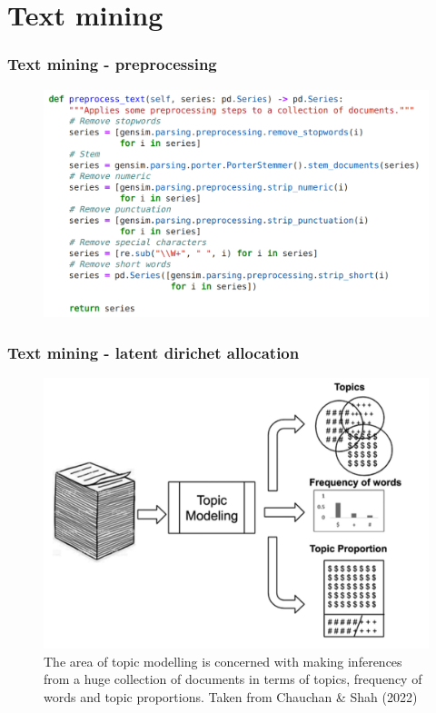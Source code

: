 \documentclass{beamer}
\begin{document}
\section{Text mining}
\begin{frame}
\frametitle{Text mining - preprocessing}

\begin{figure}
\includegraphics[width=0.6\linewidth]{../visualizations/preprocess_text_code.png}
\end{figure}

\end{frame}


\begin{frame}
\frametitle{Text mining - latent dirichet allocation}

\begin{figure}
\includegraphics[width=0.6\linewidth]{../visualizations/topic_modelling.png}
\caption{The area of topic modelling is concerned with making inferences from a huge collection of documents in terms of topics, frequency of words and topic proportions. Taken from Chauchan \& Shah (2022)}
\end{figure}

\end{frame}
\end{document}

